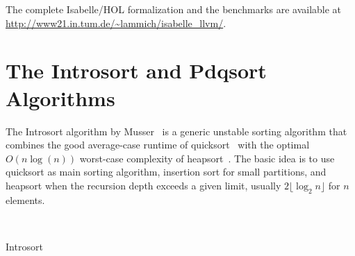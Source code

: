 \documentclass[runningheads]{llncs}
\begin{document}
  The complete Isabelle/HOL formalization and the benchmarks are available at \url{http://www21.in.tum.de/~lammich/isabelle_llvm/}.


%
%
%
%




\section{The Introsort and Pdqsort Algorithms}
  The Introsort algorithm by Musser~\cite{Muss97} is a generic unstable sorting algorithm
  that combines the good average-case runtime of quicksort~\cite{Hoare61} with the optimal $O(n\log(n))$ worst-case complexity of heapsort~\cite{Will64}.
  The basic idea is to use quicksort as main sorting algorithm, insertion sort for small partitions, and heapsort when the recursion
  depth exceeds a given limit, usually $2\lfloor\log_2 n\rfloor$ for $n$ elements.


  \begin{algorithm}
  \begin{algorithmic}[1]
       \label{l:intrs:trivial}
         \label{l:intrs:aux}
         \label{l:intrs:finalis}
      \EndIf
    \EndProcedure

       \label{l:intrs:threshold}
        ~ \label{l:intrs:heapsort}
        \Else
           \label{l:intrs:part}
            \label{l:intrs:rec1}
            \label{l:intrs:rec2}
        \EndIf
      \EndIf
    \EndProcedure
  \end{algorithmic}
  \caption{Introsort}\label{alg:introsort}
  \end{algorithm}
\end{document}
